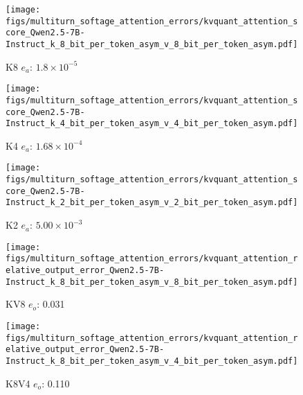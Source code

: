 %
%
\begin{figure*}
    \centering
    \begin{subfigure}{0.25\columnwidth}
    \texttt{[image: figs/multiturn\_softage\_attention\_errors/kvquant\_attention\_score\_Qwen2.5-7B-Instruct\_k\_8\_bit\_per\_token\_asym\_v\_8\_bit\_per\_token\_asym.pdf]}
    \caption{K8 $e_a$: $1.8\times 10^{-5}$}
    \label{fig:kvcache_simulated_quant_attention_score_error_layer_wise_k8_per_token_asym_Qwen2.5-7B-Instruct_multirurn_softage}
    \end{subfigure}
    \begin{subfigure}{0.25\columnwidth}
    \texttt{[image: figs/multiturn\_softage\_attention\_errors/kvquant\_attention\_score\_Qwen2.5-7B-Instruct\_k\_4\_bit\_per\_token\_asym\_v\_4\_bit\_per\_token\_asym.pdf]}
    \caption{K4 $e_a$: $1.68\times 10^{-4}$}
    \label{fig:kvcache_simulated_quant_attention_score_error_layer_wise_k4_per_token_asym_Qwen2.5-7B-Instruct_multirurn_softage}
    \end{subfigure}
    \begin{subfigure}{0.25\columnwidth}
    \texttt{[image: figs/multiturn\_softage\_attention\_errors/kvquant\_attention\_score\_Qwen2.5-7B-Instruct\_k\_2\_bit\_per\_token\_asym\_v\_2\_bit\_per\_token\_asym.pdf]}
    \caption{K2 $e_a$: $5.00\times 10^{-3}$}
    \label{fig:kvcache_simulated_quant_attention_score_error_layer_wise_k2_per_token_asym_Qwen2.5-7B-Instruct_multirurn_softage}
    \end{subfigure}
    \begin{subfigure}{0.25\columnwidth}
    \texttt{[image: figs/multiturn\_softage\_attention\_errors/kvquant\_attention\_relative\_output\_error\_Qwen2.5-7B-Instruct\_k\_8\_bit\_per\_token\_asym\_v\_8\_bit\_per\_token\_asym.pdf]}
    \caption{KV8 $e_o$: 0.031}
    \label{fig:kvcache_simulated_quant_error_layer_wise_k8v8_per_token_asym_Qwen2.5-7B-Instruct_multirurn_softage}
    \end{subfigure}
    \begin{subfigure}{0.25\columnwidth}
    \texttt{[image: figs/multiturn\_softage\_attention\_errors/kvquant\_attention\_relative\_output\_error\_Qwen2.5-7B-Instruct\_k\_8\_bit\_per\_token\_asym\_v\_4\_bit\_per\_token\_asym.pdf]}
    \caption{K8V4 $e_o$: 0.110}
    \label{fig:kvcache_simulated_quant_error_layer_wise_k8_bit_per_token_asym_v4_per_token_asym_Qwen2.5-7B-Instruct_multirurn_softage}
    \end{subfigure}

\end{figure*}
